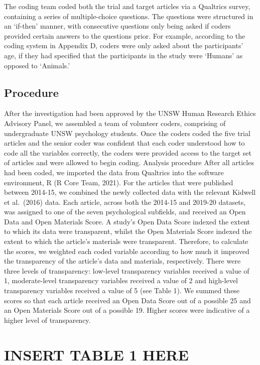 \documentclass[
  english,
  man,floatsintext]{apa6}
\begin{document}
The coding team coded both the trial and target articles via a Qualtrics survey, containing a series of multiple-choice questions. The questions were structured in an `if-then' manner, with consecutive questions only being asked if coders provided certain answers to the questions prior. For example, according to the coding system in Appendix D, coders were only asked about the participants' age, if they had specified that the participants in the study were `Humans' as opposed to `Animals.'

\hypertarget{procedure}{%
\subsection{Procedure}\label{procedure}}

After the investigation had been approved by the UNSW Human Research Ethics Advisory Panel, we assembled a team of volunteer coders, comprising of undergraduate UNSW psychology students. Once the coders coded the five trial articles and the senior coder was confident that each coder understood how to code all the variables correctly, the coders were provided access to the target set of articles and were allowed to begin coding.
Analysis procedure
After all articles had been coded, we imported the data from Qualtrics into the software environment, R (R Core Team, 2021). For the articles that were published between 2014-15, we combined the newly collected data with the relevant Kidwell et al.~(2016) data. Each article, across both the 2014-15 and 2019-20 datasets, was assigned to one of the seven psychological subfields, and received an Open Data and Open Materials Score. A study's Open Data Score indexed the extent to which its data were transparent, whilst the Open Materials Score indexed the extent to which the article's materials were transparent. Therefore, to calculate the scores, we weighted each coded variable according to how much it improved the transparency of the article's data and materials, respectively. There were three levels of transparency: low-level transparency variables received a value of 1, moderate-level transparency variables received a value of 2 and high-level transparency variables received a value of 5 (see Table 1). We summed these scores so that each article received an Open Data Score out of a possible 25 and an Open Materials Score out of a possible 19. Higher scores were indicative of a higher level of transparency.

\hypertarget{insert-table-1-here}{%
\section{INSERT TABLE 1 HERE}\label{insert-table-1-here}}
\end{document}
